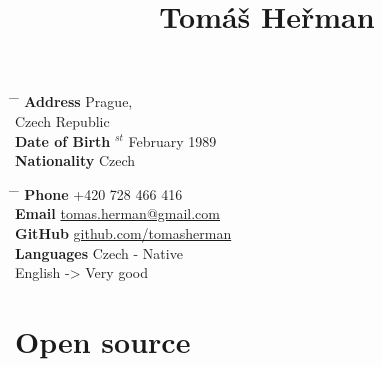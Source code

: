 \documentclass[10pt]{article} %
\begin{document}

\title{Tomáš Heřman} %


\parbox{0.5\textwidth}{ %
\begin{tabbing} %
\hspace{3cm} \= \hspace{4cm} \= \kill %
{\bf {} Address} \>Prague,\\ %
\> Czech Republic \\ %
{\bf {} Date of Birth} $^{st}$ February 1989 \\ %
{\bf {} Nationality} \> Czech %
\end{tabbing}}
\hfill %
\parbox{0.5\textwidth}{ %
\begin{tabbing} %
\hspace{3cm} \= \hspace{4cm} \= \kill %
{\bf {} Phone} \> +420 728 466 416 \\ %
{\bf {} Email} \> \href{mailto:tomas.herman@gmail.com}{tomas.herman@gmail.com} \\ %
{\bf {} GitHub} \> \href{https://github.com/tomasherman}{github.com/tomasherman} \\
{\bf {} Languages} \> Czech - Native\\
\> English -> Very good
\end{tabbing}}


\section{Open source}
\end{document}
